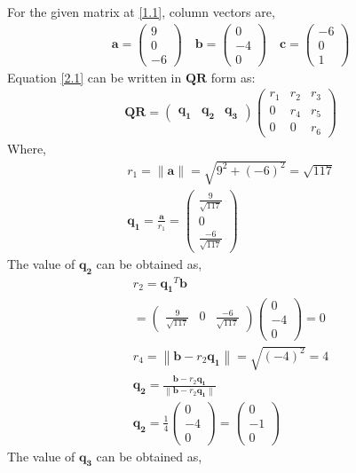 \documentclass[journal,12pt,twocolumn]{IEEEtran}
\let\vec\mathbf
\numberwithin{equation}{subsection}
\newcommand{\myvec}[1]{\ensuremath{\begin{pmatrix}#1\end{pmatrix}}}
\newcommand{\norm}[1]{\left\lVert#1\right\rVert}
\begin{document}
For the given matrix at \ref{1.1}, column vectors are,
\begin{align}
    \vec{a}=\myvec{9\\0\\-6} \quad \vec{b}=\myvec{0\\-4\\0} \quad \vec{c}=\myvec{-6\\0\\1}\label{2.2}
\end{align}
Equation  \ref{2.1} can be written in $\vec{Q}\vec{R}$ form as:
\begin{align}
    \vec{Q}\vec{R} = \myvec{\vec{q_1}&\vec{q_2}&\vec{q_3} }\myvec{r_1&r_2&r_3\\0&r_4&r_5\\0&0&r_6}  \label{2.3}
\end{align}
Where,
\begin{align}
r_1 = \norm{\vec{a}} = \sqrt{9^2+(-6)^2} = \sqrt{117} \label{2.4}\\
\vec{q_1} = \frac{\vec{a}}{r_1} = \myvec{\frac{9}{\sqrt{117}}\\0\\ \frac{-6}{\sqrt{117}}}
\end{align}
The value of $\vec{q_2}$ can be obtained as,
\begin{align}
r_2 = \vec{q_1}^T\vec{b}\\
= \myvec{\frac{9}{\sqrt{117}}&0& \frac{-6}{\sqrt{117}}}\myvec{0\\-4\\0}=0\\
r_4 = \norm{\vec{b}- r_2\vec{q_1}} = \sqrt{(-4)^2} = 4\\
\vec{q_2} = \frac{ \vec{b}- r_2\vec{q_1}}{ \norm{\vec{b}- r_2\vec{q_1}}}\\	
\vec{q_2} = \frac{1}{4}\myvec{0\\-4\\0} = \myvec{0\\-1\\0}
\end{align}
The value of $\vec{q_3}$ can be obtained as,
\end{document}
